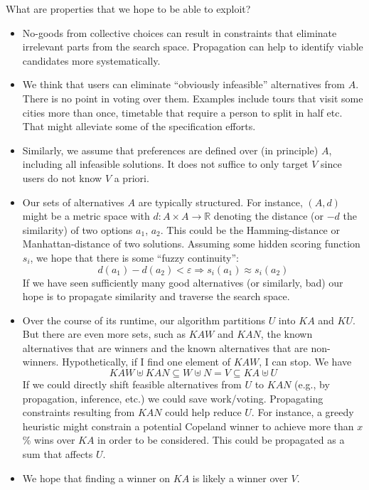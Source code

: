 \documentclass[10pt,a4paper,fleqn]{article}
\begin{document}
What are properties that we hope to be able to exploit?
\begin{itemize}
\item No-goods from collective choices can result in constraints that eliminate irrelevant
parts from the search space. Propagation can help to identify viable candidates more systematically.
\item We think that users can eliminate ``obviously infeasible'' alternatives from $A$. There is
no point in voting over them. Examples include tours that visit some cities more than once, 
timetable that require a person to split in half etc. That might alleviate some of the specification efforts.
\item Similarly, we assume that preferences are defined over (in principle) $A$, including all 
infeasible solutions. It does not suffice to only target $V$ since users do not know $V$ a priori.
\item Our sets of alternatives $A$ are typically structured. For instance, $(A, d)$ might 
be a metric space with $d : A \times A \to \mathbb{R}$ denoting the distance (or $-d$ the similarity)
of two options $a_1$, $a_2$. This could be the Hamming-distance or Manhattan-distance of two solutions.
Assuming some hidden scoring function $s_i$, we hope that there is some ``fuzzy continuity'':
\[
d(a_1) - d(a_2) < \varepsilon \Rightarrow s_i(a_1) \approx s_i(a_2)
\]
If we have seen sufficiently many good alternatives (or similarly, bad) our hope is to propagate 
similarity and traverse the search space.
\item Over the course of its runtime, our algorithm partitions $U$ into $\mathit{KA}$ and $\mathit{KU}$.
But there are even more sets, such as $\mathit{KAW}$ and $\mathit{KAN}$, the known alternatives that are winners
and the known alternatives that are non-winners. Hypothetically, if I find one element of $\mathit{KAW}$, I can stop.
We have 
\[ 
\mathit{KAW} \uplus \mathit{KAN} \subseteq W \uplus N = V \subseteq \mathit{KA} \uplus U
\]
If we could directly shift feasible alternatives from $U$ to $\mathit{KAN}$ (e.g., by propagation, inference, etc.) 
we could save work/voting. Propagating constraints resulting from $\mathit{KAN}$ could help reduce $U$.
For instance, a greedy heuristic might constrain a potential Copeland winner to achieve more than $x$\% wins over 
$\mathit{KA}$ in order to be considered. This could be propagated as a sum that affects $U$.
\item We hope that finding a winner on $\mathit{KA}$ is likely a winner over $V$.
\end{itemize}
\end{document}

